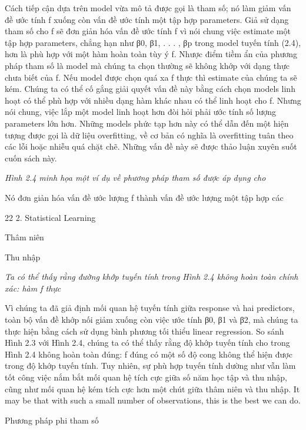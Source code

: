 Cách tiếp cận dựa trên model vừa mô tả được gọi là tham số; nó làm giảm vấn đề ước tính f xuống còn vấn đề ước tính một tập hợp parameters. Giả sử dạng tham số cho f sẽ đơn giản hóa vấn đề ước tính f vì nói chung việc estimate một tập hợp parameters, chẳng hạn như β0, β1, . . . , βp trong model tuyến tính (2.4), hơn là phù hợp với một hàm hoàn toàn tùy ý f. Nhược điểm tiềm ẩn của phương pháp tham số là model mà chúng ta chọn thường sẽ không khớp với dạng thực chưa biết của f. Nếu model được chọn quá xa f thực thì estimate của chúng ta sẽ kém. Chúng ta có thể cố gắng giải quyết vấn đề này bằng cách chọn models linh hoạt có thể phù hợp với nhiều dạng hàm khác nhau có thể linh hoạt cho f. Nhưng nói chung, việc lắp một model linh hoạt hơn đòi hỏi phải ước tính số lượng parameters lớn hơn. Những models phức tạp hơn này có thể dẫn đến một hiện tượng được gọi là dữ liệu overfitting, về cơ bản có nghĩa là overfitting tuân theo các lỗi hoặc nhiễu quá chặt chẽ. Những vấn đề này sẽ được thảo luận xuyên suốt cuốn sách này.

\noindent\textit{Hình 2.4 minh họa một ví dụ về phương pháp tham số được áp dụng cho}

Nó đơn giản hóa vấn đề ước lượng f thành vấn đề ước lượng một tập hợp các

22 2. Statistical Learning

Thâm niên

Thu nhập

\noindent\textit{Ta có thể thấy rằng đường khớp tuyến tính trong Hình 2.4 không hoàn toàn chính xác: hàm f thực}

Vì chúng ta đã giả định mối quan hệ tuyến tính giữa response và hai predictors, toàn bộ vấn đề khớp nối giảm xuống còn việc ước tính β0, β1 và β2, mà chúng ta thực hiện bằng cách sử dụng bình phương tối thiểu linear regression. So sánh Hình 2.3 với Hình 2.4, chúng ta có thể thấy rằng độ khớp tuyến tính cho trong Hình 2.4 không hoàn toàn đúng: f đúng có một số độ cong không thể hiện được trong độ khớp tuyến tính. Tuy nhiên, sự phù hợp tuyến tính dường như vẫn làm tốt công việc nắm bắt mối quan hệ tích cực giữa số năm học tập và thu nhập, cũng như mối quan hệ kém tích cực hơn một chút giữa thâm niên và thu nhập. It may be that with such a small number of observations, this is the best we can do.

Phương pháp phi tham số

